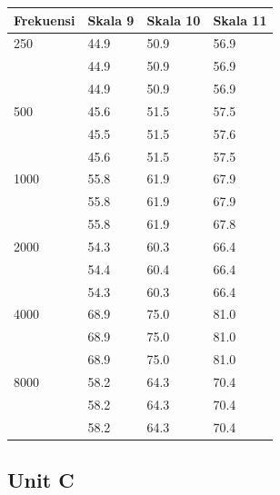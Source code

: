 \documentclass{article} %
\begin{document}
	\begin{table}[!ht]
		\begin{tabular}{|l|l|l|l|}
			\hline
			\textbf{Frekuensi}	& \textbf{Skala 9} & \textbf{Skala 10} & \textbf{Skala 11} \\ \hline
			250	& 44.9 & 50.9 & 56.9 \\ \hline
				& 44.9 & 50.9 & 56.9 \\ \hline
				& 44.9 & 50.9 & 56.9 \\ \hline \hline
			500	& 45.6 & 51.5 & 57.5 \\ \hline
				& 45.5 & 51.5 & 57.6 \\ \hline
				& 45.6 & 51.5 & 57.5 \\ \hline \hline
			1000& 55.8 & 61.9 & 67.9 \\ \hline
				& 55.8 & 61.9 & 67.9 \\ \hline
				& 55.8 & 61.9 & 67.8 \\ \hline \hline
			2000& 54.3 & 60.3 & 66.4 \\ \hline
				& 54.4 & 60.4 & 66.4 \\ \hline
				& 54.3 & 60.3 & 66.4 \\ \hline \hline
			4000& 68.9 & 75.0 & 81.0 \\ \hline
				& 68.9 & 75.0 & 81.0 \\ \hline
				& 68.9 & 75.0 & 81.0 \\ \hline \hline
			8000& 58.2 & 64.3 & 70.4 \\ \hline
				& 58.2 & 64.3 & 70.4 \\ \hline
				& 58.2 & 64.3 & 70.4 \\ \hline \hline
		\end{tabular}
	\end{table}

	\newpage

	\subsection{Unit C}
\end{document}
